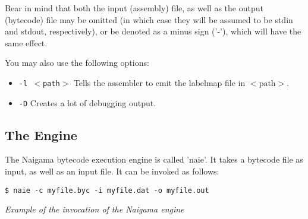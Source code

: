 Bear in mind that both the input (assembly) file, as well as the
output (bytecode) file may be omitted (in which case they will be
assumed to be stdin and stdout, respectively), or be denoted as
a minus sign ('-'), which will have the same effect.

You may also use the following options:

\begin{itemize}
\item \texttt{-l $<$path$>$} Tells the assembler to emit the labelmap
      file in $<$path$>$.
\item \texttt{-D} Creates a lot of debugging output.
\end{itemize}

\subsection{The Engine}

The Naigama bytecode execution engine is called 'naie'.
It takes a bytecode file as input, as well as an input file.
It can be invoked as follows:

\begin{myquote}
\begin{verbatim}
$ naie -c myfile.byc -i myfile.dat -o myfile.out

\end{verbatim}
\end{myquote}
\textit{Example of the invocation of the Naigama engine}

